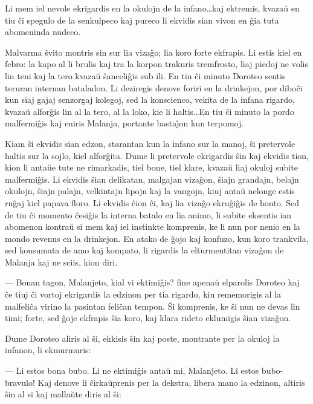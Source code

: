    Li mem iel nevole ekrigardis en la okulojn de la infano\dots kaj
ektremis, kvaza\u u en tiu \^ci spegulo de la senkulpeco kaj pureco
li ekvidis sian vivon en \^gia tuta abomeninda nudeco.

   Malvarma \^svito montris sin sur lia viza\^go; lia koro forte ekfrapis.
Li estis kiel en febro: la kapo al li brulis kaj tra la korpon
trakuris tremfrosto, liaj piedoj ne volis lin teni kaj la tero
kvaza\u u \^sanceli\^gis sub ili. En tiu \^ci minuto Doroteo sentis
teruran internan bataladon. Li deziregis denove foriri en la
drinkejon, por dibo\^ci kun siaj gajaj senzorgaj kolegoj, sed la
konscienco, vekita de la infana rigardo, kvaza\u u alfor\^gis lin al
la tero, al la loko, kie li haltis\dots En tiu \^ci minuto la pordo
malfermi\^gis kaj eniris Malanja, portante basta\^{\j}on kun
terpomoj.

   Kiam \^si ekvidis sian edzon, starantan kun la infano sur la manoj,
\^si pretervole haltis sur la sojlo, kiel alfor\^gita. Dume li
pretervole ekrigardis \^sin kaj ekvidis tion, kion li anta\u ue tute
ne rimarkadis, tiel bone, tiel klare, kvaza\u u liaj okuloj subite
malfermi\^gis. Li ekvidis \^sian delikatan, malgajan viza\^gon,
\^siajn grandajn, belajn okulojn, \^siajn palajn, velkintajn lipojn
kaj la vangojn, kiuj anta\u u nelonge estis ru\^gaj kiel papava
floro. Li ekvidis \^cion \^ci, kaj lia viza\^go ekru\^gi\^gis de
honto. Sed de tiu \^ci momento \^cesi\^gis la interna batalo en lia
animo, li subite eksentis ian abomenon kontra\u u si mem kaj iel
instinkte komprenis, ke li nun por nenio en la mondo revenus en la
drinkejon. En atako de \^gojo kaj konfuzo, kun koro trankvila, sed
konsumata de amo kaj kompato, li rigardis la elturmentitan viza\^gon
de Malanja kaj ne sciis, kion diri.

 --- Bonan tagon, Malanjeto, kial vi ektimi\^gis? fine apena\u u elparolis
Doroteo kaj \^ce tiuj \^ci vortoj ekrigardis la edzinon per tia
rigardo, kiu rememorigis al la malfeli\^ca virino la pasintan
feli\^can tempon. \^Si komprenis, ke \^si nun ne devas lin timi;
forte, sed \^goje ekfrapis \^sia koro, kaj klara rideto eklumigis
\^sian viza\^gon.

   Dume Doroteo aliris al \^si, ekkisis \^sin kaj poste, montrante per la
okuloj la infanon, li ekmurmuris:

 --- Li estos bona bubo. Li ne ektimi\^gis anta\u u mi, Malanjeto. Li
estos bubo-bravulo! Kaj denove li \^cirka\u uprenis per la dekstra,
libera mano la edzinon, altiris \^sin al si kaj malla\u ute diris al
\^si:

